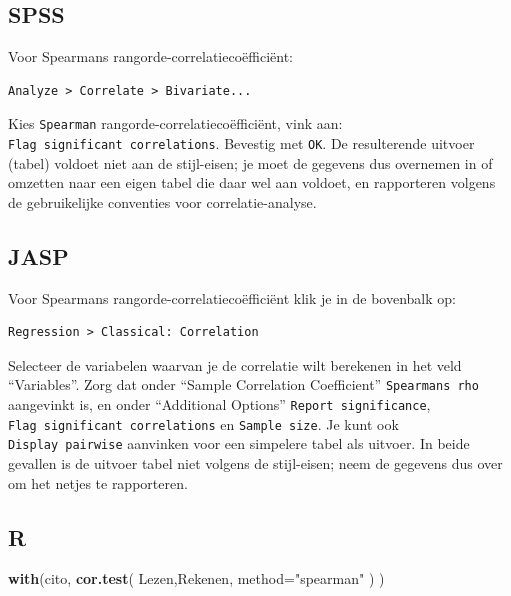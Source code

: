 \documentclass[
]{book}
\newenvironment{Shaded}{\begin{snugshade}}{\end{snugshade}}
\newcommand{\AttributeTok}[1]{\textcolor[rgb]{0.13,0.29,0.53}{#1}}
\newcommand{\FunctionTok}[1]{\textcolor[rgb]{0.13,0.29,0.53}{\textbf{#1}}}
\newcommand{\NormalTok}[1]{#1}
\newcommand{\StringTok}[1]{\textcolor[rgb]{0.31,0.60,0.02}{#1}}
\begin{document}
\subsection{SPSS}\label{spss-7}

Voor Spearmans rangorde-correlatiecoëfficiënt:

\begin{verbatim}
Analyze > Correlate > Bivariate...
\end{verbatim}

Kies \texttt{Spearman} rangorde-correlatiecoëfficiënt, vink aan:
\texttt{Flag\ significant\ correlations}. Bevestig met \texttt{OK}. De resulterende
uitvoer (tabel) voldoet niet aan de stijl-eisen; je moet de gegevens dus
overnemen in of omzetten naar een eigen tabel die daar wel aan voldoet,
en rapporteren volgens de gebruikelijke conventies voor
correlatie-analyse.

\subsection{JASP}\label{jasp-9}

Voor Spearmans rangorde-correlatiecoëfficiënt klik je in de bovenbalk op:

\begin{verbatim}
Regression > Classical: Correlation
\end{verbatim}

Selecteer de variabelen waarvan je de correlatie wilt berekenen in het veld ``Variables''. Zorg dat onder ``Sample Correlation Coefficient'' \texttt{Spearman\textquotesingle{}s\ rho} aangevinkt is, en onder ``Additional Options'' \texttt{Report\ significance}, \texttt{Flag\ significant\ correlations} en \texttt{Sample\ size}. Je kunt ook \texttt{Display\ pairwise} aanvinken voor een simpelere tabel als uitvoer. In beide gevallen is de uitvoer tabel niet volgens de stijl-eisen; neem de gegevens dus over om het netjes te rapporteren.

\subsection{R}\label{r-9}

\begin{Shaded}
\begin{Highlighting}[]
\FunctionTok{with}\NormalTok{(cito, }\FunctionTok{cor.test}\NormalTok{( Lezen,Rekenen, }\AttributeTok{method=}\StringTok{"spearman"}\NormalTok{ ) )}
\end{Highlighting}
\end{Shaded}
\end{document}
